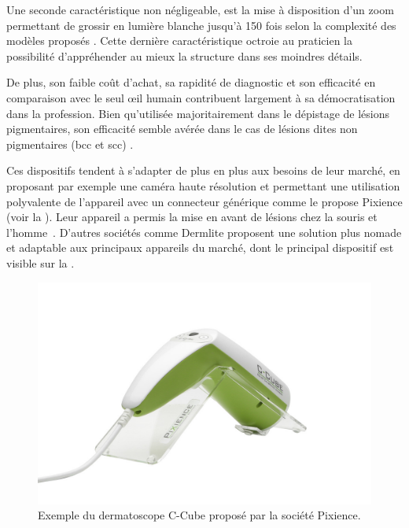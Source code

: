 Une seconde caractéristique non négligeable, est la mise à disposition d’un zoom permettant de grossir en lumière blanche jusqu'à 150 fois selon la complexité des modèles proposés \cite{Campos-do-Carmo2008}. Cette dernière caractéristique octroie au praticien la possibilité d’appréhender au mieux la structure dans ses moindres détails.\par

De plus, son faible coût d’achat, sa rapidité de diagnostic et son efficacité en comparaison avec le seul œil humain \cite{Lallas2013} contribuent largement à sa démocratisation dans la profession. Bien qu’utilisée majoritairement dans le dépistage de lésions pigmentaires, son efficacité semble avérée dans le cas de lésions dites non pigmentaires (\gls{bcc} et \gls{scc}) \cite{Lallas2013}. 

Ces dispositifs tendent à s'adapter de plus en plus aux besoins de leur marché, en proposant par exemple une caméra haute résolution et permettant une utilisation polyvalente de l'appareil avec un connecteur générique comme le propose Pixience (voir la ). Leur appareil a permis la mise en avant de lésions chez la souris et l'homme~\cite{Cinotti2016,Pillon2017}. D'autres sociétés comme Dermlite proposent une solution plus nomade et adaptable aux principaux appareils du marché, dont le principal dispositif est visible sur la .\par

\begin{figure}[H]
    \centering
    \includegraphics[width=0.75\linewidth]{contents/chapter_2/resources/example_device_ccube.jpg}
    \caption{Exemple du dermatoscope C-Cube proposé par la société Pixience.}
    \label{fig:example_device_ccube}
\end{figure}\par

